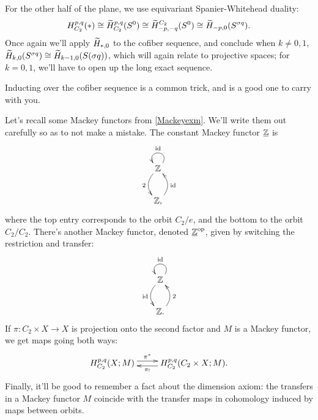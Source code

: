 For the other half of the plane,  we use equivariant Spanier-Whitehead duality:
\[H_{C_2}^{p,q}(*)\cong \widetilde H_{C_2}^{p,q}(S^0)\cong \widetilde H_{-p,-q}^{C_2}(S^0)\cong \widetilde H_{-p,0}(S^{\sigma q}).\]
Once again we'll apply $\widetilde H_{*,0}$ to the cofiber sequence, and conclude when $k\ne 0,1$, $\widetilde H_{k,0}(S^{\sigma
q})\cong \widetilde H_{k-1,0}(S(\sigma q))$, which will again relate to projective spaces; for $k = 0,1$, we'll have to open
up the long exact sequence.

Inducting over the cofiber sequence is a common trick, and is a good one to carry with you.

Let's recall some Mackey functors from \cref{Mackeyexm}. We'll write them out carefully so as to not make a
mistake. The constant Mackey functor $\underline{\mathbb Z}$ is
\[\xymatrix{
	\Z\ar@/_0.4cm/[d]_2\ar@(ur,ul)_\id\\
	\Z,\ar@/_0.4cm/[u]_\id
}\]
where the top entry corresponds to the orbit $C_2/e$, and the bottom to the orbit $C_2/C_2$. There's another Mackey
functor, denoted $\underline{\mathbb Z}^{\mathrm{op}}$, given by switching the restriction and transfer:
\[\xymatrix{
	\Z\ar@/_0.4cm/[d]_\id\ar@(ur,ul)_\id\\
	\Z.\ar@/_0.4cm/[u]_2
}\]
If $\pi\colon C_2\times X\to X$ is projection onto the second factor and $M$ is a Mackey functor, we get maps going
both ways:
\[\xymatrix{
	H_{C_2}^{p,q}(X;M)\ar@<0.1cm>[r]^-{\pi^*} & H_{C_2}^{p,q}(C_2\times X; M).\ar@<0.1cm>[l]^-{\pi_!}
}\]
Finally, it'll be good to remember a fact about the dimension axiom: the transfers in a Mackey functor $M$ coincide
with the transfer maps in cohomology induced by maps between orbits.


